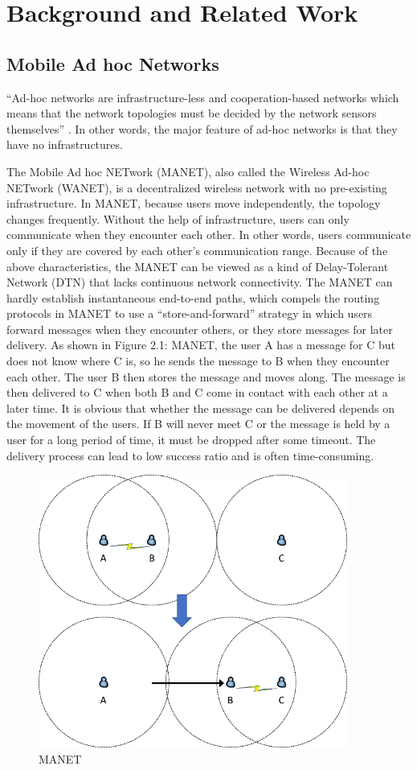 \chapter {Background and Related Work}
\label{BRW}
\section{ Mobile Ad hoc Networks}
\noindent ``Ad-hoc networks are infrastructure-less and cooperation-based networks which means that the network topologies must be decided by the network sensors themselves'' \cite {C14}. In other words, the major feature of ad-hoc networks is that they have no infrastructures.

The Mobile Ad hoc NETwork (MANET), also called the Wireless Ad-hoc NETwork (WANET), is a decentralized wireless network with no pre-existing infrastructure. In MANET, because users move independently, the topology changes frequently. Without the help of infrastructure, users can only communicate when they encounter each other. In other words, users communicate only if they are covered by each other's communication range. Because of the above characteristics, the MANET can be viewed as a kind of Delay-Tolerant Network (DTN) that lacks continuous network connectivity. The MANET can hardly establish instantaneous end-to-end paths, which compels the routing protocols in MANET to use a ``store-and-forward'' strategy in which users forward messages when they encounter others, or they store messages for later delivery. As shown in Figure 2.1: MANET, the user A has a message for C but does not know where C is, so he sends the message to B when they encounter each other. The user B then stores the message and moves along. The message is then delivered to C when both B and C come in contact with each other at a later time. It is obvious that whether the message can be delivered depends on the movement of the users. If B will never meet C or the message is held by a user for a long period of time, it must be dropped after some timeout. The delivery process can lead to low success ratio and is often time-consuming.

\begin{figure} [H]
  \centering 
  \includegraphics[width=4.0in]{figures/FIG_MANET.png}
  \caption{MANET} 
  \label{fig:MANET} %
\end{figure}

